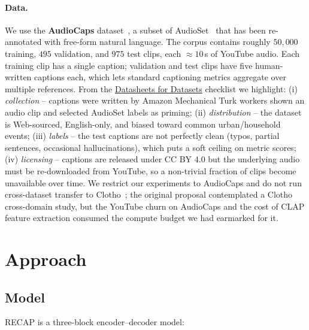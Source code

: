 \documentclass[10pt,twocolumn,letterpaper]{article}
\begin{document}
\paragraph{Data.}
We use the \textbf{AudioCaps} dataset~\cite{kim2019audiocaps}, a subset of
AudioSet~\cite{gemmeke2017audioset} that has been re-annotated with free-form
natural language. The corpus contains roughly $50{,}000$ training, $495$
validation, and $975$ test clips, each $\approx 10$\,s of YouTube audio. Each
training clip has a single caption; validation and test clips have five
human-written captions each, which lets standard captioning metrics aggregate
over multiple references. From the
\href{https://arxiv.org/abs/1803.09010}{Datasheets for Datasets} checklist we
highlight: (i) \emph{collection} -- captions were written by Amazon Mechanical
Turk workers shown an audio clip and selected AudioSet labels as priming;
(ii) \emph{distribution} -- the dataset is Web-sourced, English-only, and
biased toward common urban/household events; (iii) \emph{labels} -- the test
captions are not perfectly clean (typos, partial sentences, occasional
hallucinations), which puts a soft ceiling on metric scores;
(iv) \emph{licensing} -- captions are released under CC BY 4.0 but the
underlying audio must be re-downloaded from YouTube, so a non-trivial fraction
of clips become unavailable over time. We restrict our experiments to
AudioCaps and do not run cross-dataset transfer to Clotho~\cite{drossos2020clotho};
the original proposal contemplated a Clotho cross-domain study, but the YouTube
churn on AudioCaps and the cost of CLAP feature extraction consumed the
compute budget we had earmarked for it.

\section{Approach}

\subsection{Model}
RECAP is a three-block encoder--decoder model:
\end{document}
